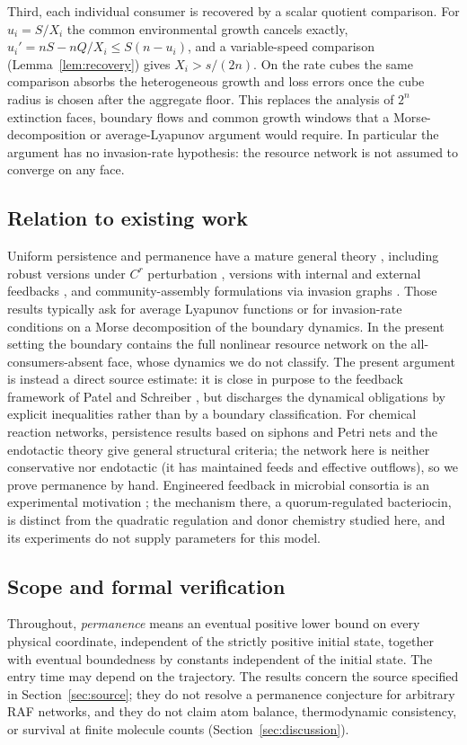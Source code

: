 \documentclass[11pt,a4paper]{article}
\theoremstyle{plain}
\theoremstyle{definition}
\theoremstyle{remark}
\begin{document}
Third, each individual consumer is recovered by a scalar quotient comparison. For $u_i=S/X_i$ the common environmental growth cancels exactly, $u_i'=nS-nQ/X_i\le S(n-u_i)$, and a variable-speed comparison (Lemma~\ref{lem:recovery}) gives $X_i>s/(2n)$. On the rate cubes the same comparison absorbs the heterogeneous growth and loss errors once the cube radius is chosen after the aggregate floor. This replaces the analysis of $2^n$ extinction faces, boundary flows and common growth windows that a Morse-decomposition or average-Lyapunov argument would require. In particular the argument has no invasion-rate hypothesis: the resource network is not assumed to converge on any face.

\subsection{Relation to existing work}
Uniform persistence and permanence have a mature general theory \cite{ButlerFreedmanWaltman1986,HutsonSchmitt1992,HofbauerSigmund1998,SmithThieme2011}, including robust versions under $C^r$ perturbation \cite{Schreiber2000}, versions with internal and external feedbacks \cite{PatelSchreiber2018}, and community-assembly formulations via invasion graphs \cite{HofbauerSchreiber2022}. Those results typically ask for average Lyapunov functions or for invasion-rate conditions on a Morse decomposition of the boundary dynamics. In the present setting the boundary contains the full nonlinear resource network on the all-consumers-absent face, whose dynamics we do not classify. The present argument is instead a direct source estimate: it is close in purpose to the feedback framework of Patel and Schreiber \cite{PatelSchreiber2018}, but discharges the dynamical obligations by explicit inequalities rather than by a boundary classification. For chemical reaction networks, persistence results based on siphons and Petri nets \cite{AngeliDeLeenheerSontag2007} and the endotactic theory \cite{CraciunNazarovPantea2013} give general structural criteria; the network here is neither conservative nor endotactic (it has maintained feeds and effective outflows), so we prove permanence by hand. Engineered feedback in microbial consortia is an experimental motivation \cite{Fedorec2021}; the mechanism there, a quorum-regulated bacteriocin, is distinct from the quadratic regulation and donor chemistry studied here, and its experiments do not supply parameters for this model.

\subsection{Scope and formal verification}
Throughout, \emph{permanence} means an eventual positive lower bound on every physical coordinate, independent of the strictly positive initial state, together with eventual boundedness by constants independent of the initial state. The entry time may depend on the trajectory. The results concern the source specified in Section~\ref{sec:source}; they do not resolve a permanence conjecture for arbitrary RAF networks, and they do not claim atom balance, thermodynamic consistency, or survival at finite molecule counts (Section~\ref{sec:discussion}).
\end{document}
